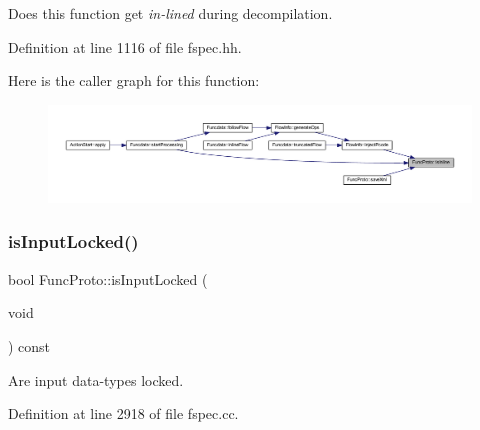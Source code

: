Does this function get {\itshape in-\/lined} during decompilation. 



Definition at line 1116 of file fspec.\+hh.

Here is the caller graph for this function\+:
\nopagebreak
\begin{figure}[H]
\begin{center}
\leavevmode
\includegraphics[width=350pt]{class_func_proto_a1195921be7caf4244970a23b0eafef67_icgraph}
\end{center}
\end{figure}
\mbox{\label{class_func_proto_aab52f093617d8bd8a67f011ba5a0d324}} 
\subsubsection{\texorpdfstring{isInputLocked()}{isInputLocked()}}
{\footnotesize\ttfamily bool Func\+Proto\+::is\+Input\+Locked (\begin{DoxyParamCaption}\item[{void}]{ }\end{DoxyParamCaption}) const}



Are input data-\/types locked. 



Definition at line 2918 of file fspec.\+cc.

